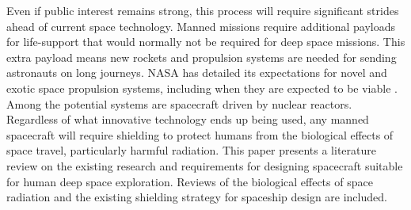 Even if public interest remains strong, this process will require significant strides ahead of current space technology. Manned missions require additional payloads for life-support that would normally not be required for deep space missions. This extra payload means new rockets and propulsion systems are needed for sending astronauts on long journeys. NASA has detailed its expectations for novel and exotic space propulsion systems, including when they are expected to be viable \cite{nasa-propulsion}. Among the potential systems are spacecraft driven by nuclear reactors. Regardless of what innovative technology ends up being used, any manned spacecraft will require shielding to protect humans from the biological effects of space travel, particularly harmful radiation. This paper presents a literature review on the existing research and requirements for designing spacecraft suitable for human deep space exploration. Reviews of the biological effects of space radiation and the existing shielding strategy for spaceship design are included.
